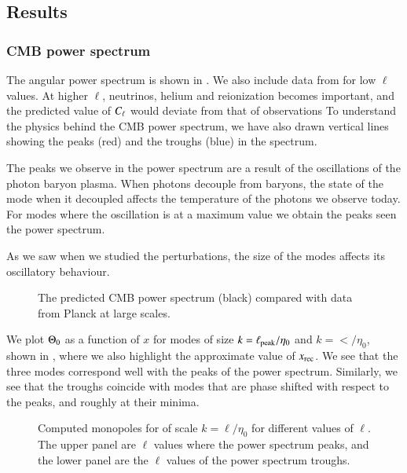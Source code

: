 \subsection{Results}\label{ssec:M4:results}


\subsubsection{CMB power spectrum} \label{sssec:M4:results:angular_power_spectrum}
The angular power spectrum is shown in . We also include data from \cite{Planck2020} for low $\ell$ values. At higher $\ell$, neutrinos, helium and reionization becomes important, and the predicted value of $C_\ell$ would deviate from that of observations  To understand the physics behind the CMB power spectrum, we have also drawn vertical lines showing the peaks (red) and the troughs (blue) in the spectrum. 

The peaks we observe in the power spectrum are a result of the oscillations of the photon baryon plasma. When photons decouple from baryons, the state of the mode when it decoupled affects the temperature of the photons we observe today. For modes where the oscillation is at a maximum value we obtain the peaks seen the power spectrum. 

 As we saw when we studied the perturbations, the size of the modes affects its oscillatory behaviour.  

\begin{figure}[ht!]
    \caption{The predicted CMB power spectrum (black) compared with data from Planck at large scales. }
    \label{fig:M4:results:peaks_and_troughs_cells}
\end{figure}

We plot $\Theta_0$ as a function of $x$ for modes of size $k=\ell_\mathrm{peak}/\eta_0$ and $k=\lt/\eta_0$, shown in , where we also highlight the approximate value of $x_\mathrm{rec}$. We see that the three modes correspond well with the peaks of the power spectrum. Similarly, we see that the troughs coincide with modes that are phase shifted with respect to the peaks, and roughly at their minima.     

\begin{figure}[ht!]
    \caption{Computed monopoles for of scale $k=\ell/\eta_0$ for different values of $\ell$. The upper panel are $\ell$ values where the power spectrum peaks, and the lower panel are the $\ell$ values of the power spectrum troughs.}
    \label{fig:M4:results:theta0_at_peaks_and_troughs}
\end{figure}

